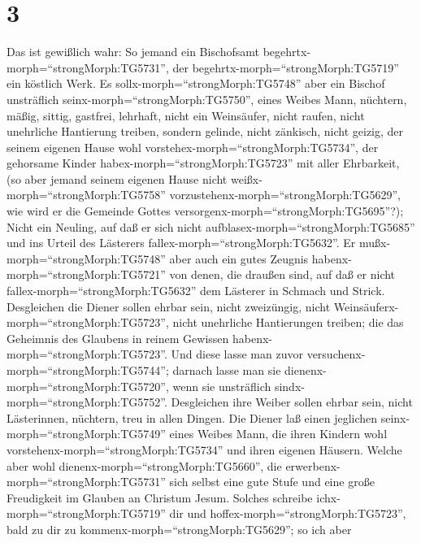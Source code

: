 \hypertarget{section-2}{%
\section{3}\label{section-2}}

 Das ist gewißlich wahr: So jemand ein Bischofsamt
begehrtx-morph=``strongMorph:TG5731'', der
begehrtx-morph=``strongMorph:TG5719'' ein köstlich Werk.  Es
sollx-morph=``strongMorph:TG5748'' aber ein Bischof unsträflich
seinx-morph=``strongMorph:TG5750'', eines Weibes Mann, nüchtern, mäßig,
sittig, gastfrei, lehrhaft,  nicht ein Weinsäufer, nicht
raufen, nicht unehrliche Hantierung treiben, sondern gelinde, nicht
zänkisch, nicht geizig,  der seinem eigenen Hause wohl
vorstehex-morph=``strongMorph:TG5734'', der gehorsame Kinder
habex-morph=``strongMorph:TG5723'' mit aller Ehrbarkeit, 
(so aber jemand seinem eigenen Hause nicht
weißx-morph=``strongMorph:TG5758''
vorzustehenx-morph=``strongMorph:TG5629'', wie wird er die Gemeinde
Gottes versorgenx-morph=``strongMorph:TG5695''?);  Nicht ein
Neuling, auf daß er sich nicht aufblasex-morph=``strongMorph:TG5685''
und ins Urteil des Lästerers fallex-morph=``strongMorph:TG5632''.
 Er mußx-morph=``strongMorph:TG5748'' aber auch ein gutes
Zeugnis habenx-morph=``strongMorph:TG5721'' von denen, die draußen sind,
auf daß er nicht fallex-morph=``strongMorph:TG5632'' dem Lästerer in
Schmach und Strick.  Desgleichen die Diener sollen ehrbar
sein, nicht zweizüngig, nicht Weinsäuferx-morph=``strongMorph:TG5723'',
nicht unehrliche Hantierungen treiben;  die das Geheimnis
des Glaubens in reinem Gewissen habenx-morph=``strongMorph:TG5723''.
 Und diese lasse man zuvor
versuchenx-morph=``strongMorph:TG5744''; darnach lasse man sie
dienenx-morph=``strongMorph:TG5720'', wenn sie unsträflich
sindx-morph=``strongMorph:TG5752''.  Desgleichen ihre
Weiber sollen ehrbar sein, nicht Lästerinnen, nüchtern, treu in allen
Dingen.  Die Diener laß einen jeglichen
seinx-morph=``strongMorph:TG5749'' eines Weibes Mann, die ihren Kindern
wohl vorstehenx-morph=``strongMorph:TG5734'' und ihren eigenen Häusern.
 Welche aber wohl dienenx-morph=``strongMorph:TG5660'', die
erwerbenx-morph=``strongMorph:TG5731'' sich selbst eine gute Stufe und
eine große Freudigkeit im Glauben an Christum Jesum. 
Solches schreibe ichx-morph=``strongMorph:TG5719'' dir und
hoffex-morph=``strongMorph:TG5723'', bald zu dir zu
kommenx-morph=``strongMorph:TG5629'';  so ich aber
